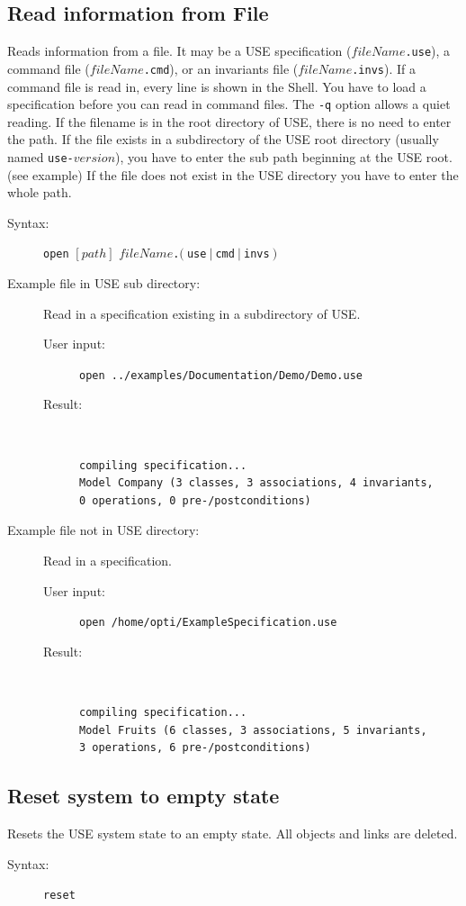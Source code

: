\documentclass[a4paper,titlepage,oneside,final]{scrreprt} %
\begin{document}
\subsection{Read information from File}
Reads information from a file. It may be a USE specification ($\mathit{fileName}$\verb+.use+),
a command file ($\mathit{fileName}$\verb+.cmd+), or an invariants file ($\mathit{fileName}$\verb+.invs+).
If a command file is read in, every line is shown in the Shell. You have to load a specification before you can read in command files.
The \verb+-q+ option allows a quiet reading.
If the filename is in the root directory of USE, there is no need to enter
the path. If the file exists in a subdirectory of the USE root directory (usually named \verb+use-+$\mathit{version}$),
you have to enter the sub path beginning at the USE root. (see example)
If the file does not exist in the USE directory you have to enter the whole path.
\begin{description}
\item[Syntax:] \verb+open+ $[\mathit{path}]$ $\mathit{fileName}$\verb+.+$(~$\verb+use+$~|~$\verb+cmd+$~|~$\verb+invs+$~)$
\item[Example file in USE sub directory:] Read in a specification existing in a subdirectory
of USE.
\begin{description}
\item[User input:]\verb+open ../examples/Documentation/Demo/Demo.use+
\item[Result:]~
\begin{verbatim}
compiling specification...
Model Company (3 classes, 3 associations, 4 invariants,
0 operations, 0 pre-/postconditions)
\end{verbatim}
\end{description}
\item[Example file not in USE directory:] Read in a specification.
\begin{description}
\item[User input:]\verb+open /home/opti/ExampleSpecification.use+
\item[Result:]~
\begin{verbatim}
compiling specification...
Model Fruits (6 classes, 3 associations, 5 invariants,
3 operations, 6 pre-/postconditions)
\end{verbatim}
\end{description}
\end{description}
\subsection{Reset system to empty state}
Resets the USE system state to an empty state. All objects and links are deleted.
\begin{description}
\item[Syntax:] \verb+reset+
\end{description}
\end{document}
